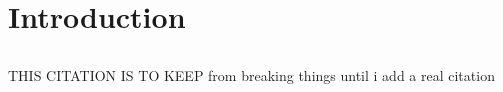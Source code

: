 \section{Introduction}   \label{chap:Introduction}

\subsection{}

THIS CITATION IS TO KEEP from breaking things until i add a real citation
\cite{WSULibrary}